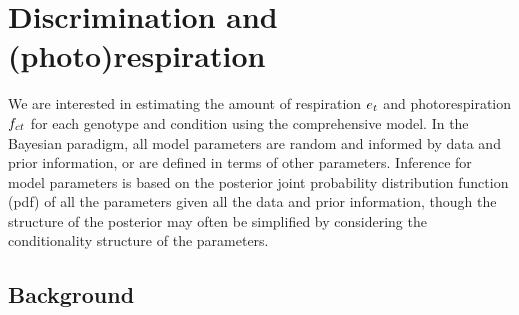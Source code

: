 \documentclass[12pt]{article}
\begin{document}
%
\newcommand{\sAL}{A_{\subctp}} %
 \newcommand{\sdataAL}{\data{A}_{\subctpr}} %
 \newcommand{\ssigAL}{\sdatasig{A}} %

\newcommand{\sgm}{g_{\textrm{m}\subctp}} %

\newcommand{\sE}{E_{\subctp}} %
 \newcommand{\sdataE}{\data{E}_{\subctpr}} %
 \newcommand{\ssigE}{\sdatasig{E}} %

\newcommand{\sgbc}{g_{\textrm{bc}}} %
 \newcommand{\sdotgbc}{\dot{g}_{\textrm{bc}}} %
 \renewcommand{\sgbc}{\sdotgbc} %

\newcommand{\sgtc}{g_{\textrm{tc}\subctp}} %
 \newcommand{\sdatagtc}{\data{g}_{\textrm{tc}\subctpr}} %
 \newcommand{\ssiggtc}{\sdatasig{g_{\textrm{tc}}}} %



\maketitle     %
\tableofcontents  %



\section{Discrimination and (photo)respiration}

We are interested in estimating the
  amount of respiration $e_{t}$ and photorespiration $f_{ct}$
  for each genotype and condition
  using the comprehensive model.
In the Bayesian paradigm, all model parameters are random
  and informed by data and prior information,
  or are defined in terms of other parameters.
Inference for model parameters is based on the posterior joint probability distribution function (pdf)
  of all the parameters given all the data and prior information,
  though the structure of the posterior may often be simplified
  by considering the conditionality structure of the parameters.

\subsection{Background}
\end{document}

